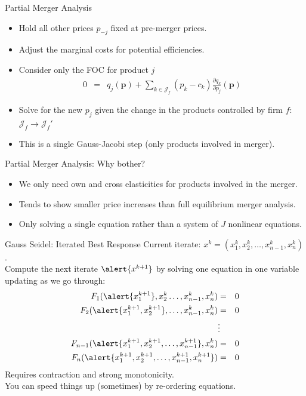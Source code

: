 \documentclass[xcolor=pdftex,dvipsnames,table,mathserif]{beamer}
\begin{document}
\begin{frame}{Partial Merger Analysis}
\begin{itemize}
\item Hold all other prices $p_{-j}$ fixed at \alert{pre-merger} prices.
\item Adjust the marginal costs for potential efficiencies.
\item Consider only the FOC for product $j$
\begin{eqnarray*}
0&=& q_j(\mathbf{p}) + \sum_{k \in \mathcal{J}_f} (p_k - c_k) \frac{\partial q_{k}}{\partial p_j}(\mathbf{p})
\end{eqnarray*}
\item Solve for the new $p_j$ given the change in the products controlled by firm $f$: $\mathcal{J}_f \rightarrow \mathcal{J}_f'$
\item This is a single Gauss-Jacobi step (only products involved in merger).
\end{itemize}
\end{frame} 

\begin{frame}{Partial Merger Analysis: Why bother?}
\begin{itemize}
\item We only need own and cross elasticities for products involved in the merger.
\item Tends to show smaller price increases than full equilibrium merger analysis.
\item Only solving a single equation rather than a system of $J$ nonlinear equations.
\end{itemize}
\end{frame} 


\begin{frame}{Gauss Seidel: Iterated Best Response}
Current iterate: $x^k = (x_1^k,x_2^k,\ldots,x_{n-1}^k,x_n^k)$.\\
\vspace{0.5cm}
Compute the next iterate $\alert{x^{k+1}}$ by solving one equation in one variable updating as we go through:\begin{eqnarray*}
F_1 (\alert{x_1^{k+1}},x_2^k \ldots, x_{n-1}^k, x_n^k)  &=& 0 \\
F_2  (\alert{x_1^{k+1},x_2^{k+1}},\ldots,x_{n-1}^k,x_n^k)  &=& 0\\
&\vdots&\\ 
F_{n-1}  (\alert{x_1^{k+1},x_2^{k+1},\ldots,x_{n-1}^{k+1}},x_n^k)  &=& 0\\
F_n  (\alert{x_1^{k+1},x_2^{k+1},\ldots,x_{n-1}^{k+1}, x_n^{k+1}})  &=& 0\\
\end{eqnarray*}
Requires contraction and strong monotonicity.\\
You can speed things up (sometimes) by re-ordering equations.
\end{frame} 
\end{document}
